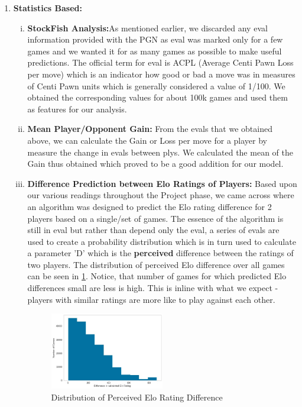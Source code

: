 \documentclass[11pt,a4paper]{article}
\begin{document}
\begin{enumerate}[I]
\begin{enumerate}[(i)]
    \end{enumerate}
        
    \item \textbf{Statistics Based:}
    \begin{enumerate} [(i)]
        \item \textbf{StockFish Analysis:}As mentioned earlier, we discarded any eval information provided with the PGN as eval was marked only for a few games and we wanted it for as many games as possible to make useful predictions. The official term for eval is ACPL (Average Centi Pawn Loss per move) which is an indicator how good or bad a move was in measures of Centi Pawn units which is generally considered a value of 1/100. We obtained the corresponding values for about 100k games and used them as features for our analysis.
        
        \item \textbf{Mean Player/Opponent Gain:} 
        From the evals that we obtained above, we can calculate the Gain or Loss per move for a player by measure the change in evals between plys. We calculated the mean of the Gain thus obtained which proved to be a good addition for our model.
        
        \item \textbf{Difference Prediction between Elo Ratings of Players:} Based upon our various readings throughout the Project phase, we came across \cite{PredicteDiffBetweenElo} where an algorithm was designed to predict the Elo rating difference for 2 players based on a single/set of games. The essence of the algorithm is still in eval but rather than depend only the eval, a series of evals are used to create a probability distribution which is in turn used to calculate a parameter 'D' which  is the \textbf{perceived} difference between the ratings of two players. The distribution of perceived Elo difference over all games can be seen in \ref{fig:PerceivedInDiff}. Notice, that number of games for which predicted Elo differences small are less is high. This is inline with what we expect - players with similar ratings are more like to play against each other.
        
        \begin{figure}[!ht]
            \includegraphics[width=0.5\textwidth]{diff.jpeg}
            \caption{Distribution of Perceived Elo Rating Difference}
            \label{fig:PerceivedInDiff}
        \end{figure}
    
    \end{enumerate}
\end{enumerate}
\end{document}
